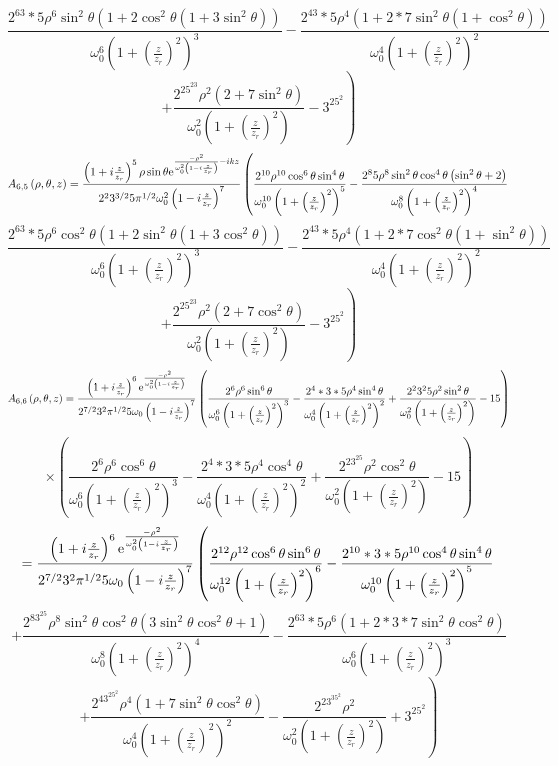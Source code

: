 \documentclass[11pt]{amsart}
\makeatletter
\newcommand{\e}{{\rm e}}				%
\newcommand{\0}{\varnothing}		%
\newcommand{\1}{!}
\newcommand{\2}{@}
\newcommand{\3}{\#}
\newcommand{\4}{\$}
\newcommand{\5}{\%}
\newcommand{\6}{$^\wedge$}
\newcommand{\7}{\&}
\newcommand{\8}{*}
\newcommand{\9}{(}
\makeatother
\begin{document}
\[
\left. \frac{2^63*5\rho^6\sin^2\theta\left(1+2\cos^2\theta\left(1 +3\sin^2\theta\right)\right)}{\omega_0^6\left(1+\left(\frac{z}{z_r}\right)^2\right)^3}-\frac{2^43*5\rho^4\left(1 +2*7\sin^2\theta\left(1+\cos^2\theta\right)\right)}{\omega_0^4\left(1+\left(\frac{z}{z_r}\right)^2\right)^2}\right.
\]
\[
\left.+\frac{2^25^23\rho^2\left(2+7\sin^2\theta\right)}{\omega_0^2\left(1+\left(\frac{z}{z_r}\right)^2\right)}-3^25^2\right)
\]
\[
A_{6,5}\left(\rho,\theta,z\right) = \frac{\left(1+i\frac{z}{z_r}\right)^5\rho \sin\theta \e^{\frac{-\rho^2}{\omega_0^2\left(1-i\frac{z}{z_r}\right)}-ikz}}{2^23^{3/2}5\pi^{1/2}\omega_0^2\left(1-i\frac{z}{z_r}\right)^7}\left(\frac{2^{10}\rho^{10}\cos^6\theta\sin^4\theta}{\omega_0^{10}\left(1+\left(\frac{z}{z_r}\right)^2\right)^5}-\frac{2^85\rho^8\sin^2\theta\cos^4\theta\left(\sin^2\theta+2\right)}{\omega_0^8\left(1+\left(\frac{z}{z_r}\right)^2\right)^4}\right.
\]
\[
\left. \frac{2^63*5\rho^6\cos^2\theta\left(1+2\sin^2\theta\left(1 +3\cos^2\theta\right)\right)}{\omega_0^6\left(1+\left(\frac{z}{z_r}\right)^2\right)^3}-\frac{2^43*5\rho^4\left(1 +2*7\cos^2\theta\left(1+\sin^2\theta\right)\right)}{\omega_0^4\left(1+\left(\frac{z}{z_r}\right)^2\right)^2}\right.
\]
\[
\left.+\frac{2^25^23\rho^2\left(2+7\cos^2\theta\right)}{\omega_0^2\left(1+\left(\frac{z}{z_r}\right)^2\right)}-3^25^2\right)
\]
\[
A_{6,6}\left(\rho,\theta,z\right)  = \frac{\left(1+i\frac{z}{z_r}\right)^6\e^{\frac{-\rho^2}{\omega_0^2\left(1-i\frac{z}{z_r}\right)}}}{2^{7/2}3^2\pi^{1/2}5\omega_0\left(1-i\frac{z}{z_r}\right)^7}\left(\frac{2^6\rho^6\sin^6\theta}{\omega_0^6\left(1+\left(\frac{z}{z_r}\right)^2\right)^3}-\frac{2^4*3*5\rho^4 \sin^4\theta}{\omega_0^4\left(1+\left(\frac{z}{z_r}\right)^2\right)^2}+\frac{2^23^25\rho^2\sin^2\theta}{\omega_0^2\left(1+\left(\frac{z}{z_r}\right)^2\right)}-15\right)
\]
\[
\times \left(\frac{2^6\rho^6\cos^6\theta}{\omega_0^6\left(1+\left(\frac{z}{z_r}\right)^2\right)^3}-\frac{2^4*3*5\rho^4 \cos^4\theta}{\omega_0^4\left(1+\left(\frac{z}{z_r}\right)^2\right)^2}+\frac{2^23^25\rho^2\cos^2\theta}{\omega_0^2\left(1+\left(\frac{z}{z_r}\right)^2\right)}-15\right)
\]
\[
= \frac{\left(1+i\frac{z}{z_r}\right)^6\e^{\frac{-\rho^2}{\omega_0^2\left(1-i\frac{z}{z_r}\right)}}}{2^{7/2}3^2\pi^{1/2}5\omega_0\left(1-i\frac{z}{z_r}\right)^7}\left(\frac{2^{12}\rho^{12}\cos^6\theta\sin^6\theta}{\omega_0^{12}\left(1+\left(\frac{z}{z_r}\right)^2\right)^6}-\frac{2^{10}*3*5\rho^{10}\cos^4\theta\sin^4\theta}{\omega_0^{10}\left(1+\left(\frac{z}{z_r}\right)^2\right)^5}\right.
\]
\[
\left.+\frac{2^83^25\rho^8\sin^2\theta\cos^2\theta\left(3\sin^2\theta \cos^2\theta+1 \right)}{\omega_0^8\left(1+\left(\frac{z}{z_r}\right)^2\right)^4}-\frac{2^63*5\rho^6\left(1+ 2*3*7\sin^2\theta \cos^2\theta\right)}{\omega_0^6\left(1+\left(\frac{z}{z_r}\right)^2\right)^3}\right.
\]
\[
\left.+\frac{2^43^25^2\rho^4\left(1+7\sin^2\theta\cos^2\theta\right)}{\omega_0^4\left(1+\left(\frac{z}{z_r}\right)^2\right)^2}-\frac{2^23^35^2\rho^2}{\omega_0^2\left(1+\left(\frac{z}{z_r}\right)^2\right)}+3^25^2\right)
\]
\newpage
\end{document}
